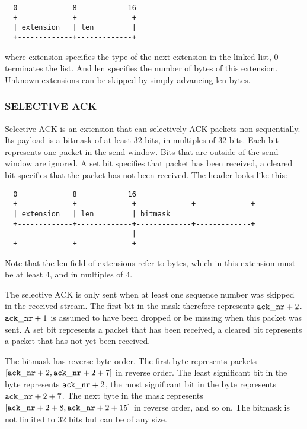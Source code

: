 \documentclass[11pt,a4paper,oneside,draft]{article}
\begin{document}
{\begin{verbatim}
  0             8            16
  +-------------+-------------+
  | extension   | len         |
  +-------------+-------------+
\end{verbatim}}

where extension specifies the type of the next extension in the linked list, 0 terminates the list. And len specifies the number of bytes of this extension. Unknown extensions can be skipped by simply advancing len bytes.

{\subsubsection {SELECTIVE ACK}}

Selective ACK is an extension that can selectively ACK packets non-sequentially. Its payload is a bitmask of at least 32 bits, in multiples of 32 bits. Each bit represents one packet in the send window. Bits that are outside of the send window are ignored. A set bit specifies that packet has been received, a cleared bit specifies that the packet has not been received. The header looks like this:

{\begin{verbatim}
  0             8            16
  +-------------+-------------+-------------+-------------+
  | extension   | len         | bitmask
  +-------------+-------------+-------------+-------------+
                              |
  +-------------+-------------+
\end{verbatim}}

Note that the len field of extensions refer to bytes, which in this extension must be at least 4, and in multiples of 4.

The selective ACK is only sent when at least one sequence number was skipped in the received stream. The first bit in the mask therefore represents ${\tt ack\_nr} + 2$. ${\tt ack\_nr} + 1$ is assumed to have been dropped or be missing when this packet was sent. A set bit represents a packet that has been received, a cleared bit represents a packet that has not yet been received.

The bitmask has reverse byte order. The first byte represents packets $[{\tt ack\_nr} + 2, {\tt ack\_nr} + 2 + 7]$ in reverse order. The least significant bit in the byte represents ${\tt ack\_nr} + 2$, the most significant bit in the byte represents ${\tt ack\_nr} + 2 + 7$. The next byte in the mask represents $[{\tt ack\_nr} + 2 + 8, {\tt ack\_nr} + 2 + 15]$ in reverse order, and so on. The bitmask is not limited to 32 bits but can be of any size.
\end{document}
